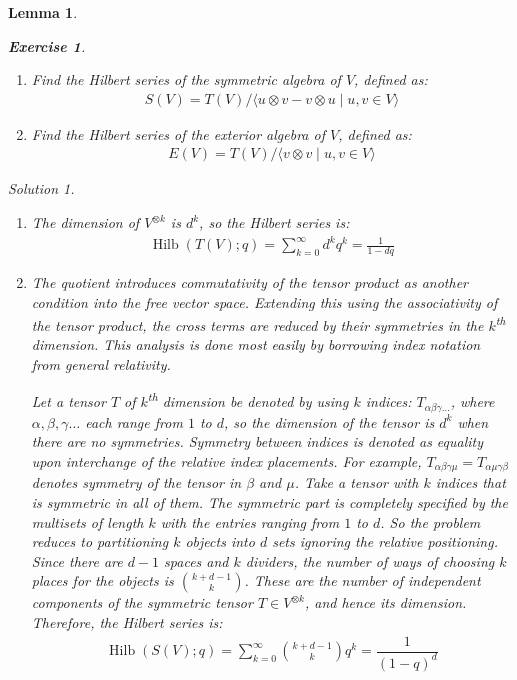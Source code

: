 \documentclass{article}
\newtheorem{Lemma}{Lemma}
\theoremstyle{definition}
\newtheorem{Exercise}{Exercise}
\theoremstyle{remark}
\newtheorem*{Solution*}{Solution}
\theoremstyle{underline}
\theoremstyle{underline}
\DeclareMathOperator{\Hilb}{Hilb}
\renewcommand{\th}{\textsuperscript{th}\xspace}
\begin{document}
\begin{Lemma}
\begin{Exercise}
\begin{enumerate}[label=(\alph*)]
			\item Find the Hilbert series of the \emph{symmetric algebra} of $V$, defined as:
			\begin{gather*}
			 	S(V) = T(V)/\langle u \otimes v - v \otimes u \mid u,v \in V \rangle
			 \end{gather*} 

			\item Find the Hilbert series of the \emph{exterior algebra} of $V$, defined as:
			\begin{gather*}
				E(V) = T(V)/\langle v \otimes v \mid u,v \in V \rangle
			\end{gather*}
		\end{enumerate}
	\end{Exercise}

	\begin{Solution*}
		\begin{enumerate}[label=(\alph*)]
			\item The dimension of $V^{\otimes k}$ is $d^k$, so the Hilbert series is:
			\begin{gather*}
				\Hilb(T(V);q) = \sum_{k=0}^{\infty}d^k q^k = \frac{1}{1-dq}
			\end{gather*}
			
			\item The quotient introduces commutativity of the tensor product as another condition into the free vector space. Extending this using the associativity of the tensor product, the cross terms are reduced by their symmetries in the $k$\th dimension. This analysis is done most easily by borrowing index notation from general relativity.

			Let a tensor $T$ of $k$\th dimension be denoted by using $k$ indices: $T_{\alpha\beta\gamma\dots}$, where $\alpha,\beta,\gamma \dots$ each range from $1$ to $d$, so the dimension of the tensor is $d^k$ when there are no symmetries. Symmetry between indices is denoted as equality upon interchange of the relative index placements. For example, $T_{\alpha\beta\gamma\mu} = T_{\alpha\mu\gamma\beta}$ denotes symmetry of the tensor in $\beta$ and $\mu$. Take a tensor with $k$ indices that is symmetric in all of them. The symmetric part is completely specified by the multisets of length $k$ with the entries ranging from $1$ to $d$. So the problem reduces to partitioning $k$ objects into $d$ sets ignoring the relative positioning. Since there are $d-1$ spaces and $k$ dividers, the number of ways of choosing $k$ places for the objects is $\binom{k+d-1}{k}$. These are the number of independent components of the symmetric tensor $T \in V^{\otimes k}$, and hence its dimension. Therefore, the Hilbert series is:
			\begin{gather*}
				\Hilb(S(V);q) = \sum_{k=0}^{\infty} \binom{k+d-1}{k} q^k = \dfrac 1 {(1 - q)^d}
			\end{gather*}


\end{enumerate}
\end{Solution*}
\end{Lemma}
\end{document}
